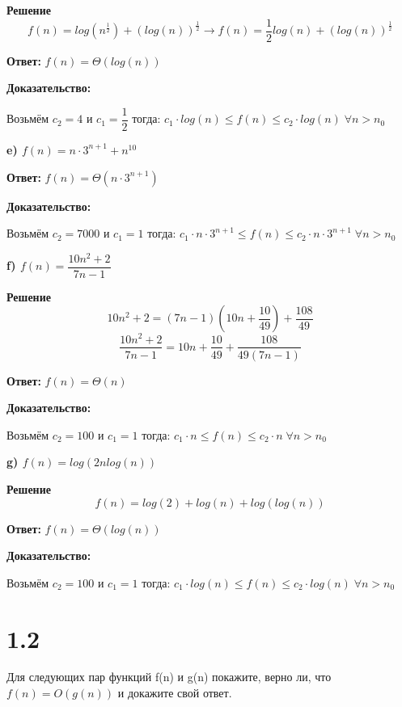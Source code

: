\documentclass{article}
\begin{document}
\textbf{Решение}
\begin{equation*}
    f(n) = log\left(n^{\frac{1}{2}}\right) + (log(n))^{\frac{1}{2}} \longrightarrow f(n) = \dfrac{1}{2} log(n) + (log(n))^{\frac{1}{2}}
\end{equation*}

\textbf{Ответ:} $f(n) = \Theta(log(n))$

\textbf{Доказательство:}

Возьмём $c_2 = 4$ и $c_1 = \dfrac{1}{2}$ тогда: $c_1 \cdot log(n) \leq f(n) \leq c_2 \cdot log(n) \; \forall n > n_0$ 

\bigskip
\bigskip
\textbf{e) $f(n) = n\cdot 3^{n + 1} + n^{10}$}

\textbf{Ответ:} $f(n) = \Theta(n\cdot 3^{n + 1})$

\textbf{Доказательство:}

Возьмём $c_2 = 7000$ и $c_1 = 1$ тогда: $c_1 \cdot n\cdot 3^{n + 1} \leq f(n) \leq c_2 \cdot n\cdot 3^{n + 1} \; \forall n > n_0$


\bigskip
\bigskip
\textbf{f) $f(n) = \dfrac{10n^2 + 2}{7n - 1}$}

\textbf{Решение}
\begin{equation*}
    10n^2 + 2 = (7n - 1)\left(10n + \dfrac{10}{49}\right) + \dfrac{108}{49}
\end{equation*}
\begin{equation*}
    \dfrac{10n^2 + 2}{7n - 1} = 10n + \dfrac{10}{49} + \dfrac{108}{49(7n - 1)}
\end{equation*}

\textbf{Ответ:} $f(n) = \Theta(n)$

\textbf{Доказательство:}

Возьмём $c_2 = 100$ и $c_1 = 1$ тогда: $c_1 \cdot n \leq f(n) \leq c_2 \cdot n \; \forall n > n_0$ 


\bigskip
\bigskip
\textbf{g) $f(n) = log(2n log(n))$}

\textbf{Решение}
\begin{equation*}
    f(n) = log(2) + log(n) + log(log(n))
\end{equation*}

\textbf{Ответ:} $f(n) = \Theta(log(n))$

\textbf{Доказательство:}

Возьмём $c_2 = 100$ и $c_1 = 1$ тогда: $c_1 \cdot log(n) \leq f(n) \leq c_2 \cdot log(n) \; \forall n > n_0$ 



\section*{1.2}
Для следующих пар функций f(n) и g(n) покажите, верно ли, что
$f(n) = O(g(n))$ и докажите свой ответ.
\end{document}
